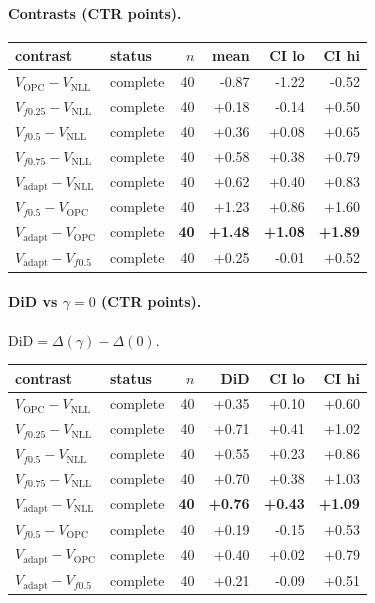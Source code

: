 \documentclass[10pt,a4paper]{article}
\begin{document}
\paragraph{Contrasts (CTR points).}
{\centering\small\begin{tabular}{llrrrr}
\toprule contrast & status & $n$ & mean & CI lo & CI hi \\
\midrule
$V_{\mathrm{OPC}}-V_{\mathrm{NLL}}$ & complete & 40 & -0.87 & -1.22 & -0.52 \\
$V_{f0.25}-V_{\mathrm{NLL}}$ & complete & 40 & +0.18 & -0.14 & +0.50 \\
$V_{f0.5}-V_{\mathrm{NLL}}$ & complete & 40 & +0.36 & +0.08 & +0.65 \\
$V_{f0.75}-V_{\mathrm{NLL}}$ & complete & 40 & +0.58 & +0.38 & +0.79 \\
$V_{\mathrm{adapt}}-V_{\mathrm{NLL}}$ & complete & 40 & +0.62 & +0.40 & +0.83 \\
$V_{f0.5}-V_{\mathrm{OPC}}$ & complete & 40 & +1.23 & +0.86 & +1.60 \\
\textbf{$V_{\mathrm{adapt}}-V_{\mathrm{OPC}}$} & complete & \textbf{40} & \textbf{+1.48} & \textbf{+1.08} & \textbf{+1.89} \\
$V_{\mathrm{adapt}}-V_{f0.5}$ & complete & 40 & +0.25 & -0.01 & +0.52 \\
\bottomrule\end{tabular}\par}
\paragraph{DiD vs $\gamma=0$ (CTR points).} $\mathrm{DiD}=\Delta(\gamma)-\Delta(0)$.
{\centering\small\begin{tabular}{llrrrr}
\toprule contrast & status & $n$ & DiD & CI lo & CI hi \\
\midrule
$V_{\mathrm{OPC}}-V_{\mathrm{NLL}}$ & complete & 40 & +0.35 & +0.10 & +0.60 \\
$V_{f0.25}-V_{\mathrm{NLL}}$ & complete & 40 & +0.71 & +0.41 & +1.02 \\
$V_{f0.5}-V_{\mathrm{NLL}}$ & complete & 40 & +0.55 & +0.23 & +0.86 \\
$V_{f0.75}-V_{\mathrm{NLL}}$ & complete & 40 & +0.70 & +0.38 & +1.03 \\
\textbf{$V_{\mathrm{adapt}}-V_{\mathrm{NLL}}$} & complete & \textbf{40} & \textbf{+0.76} & \textbf{+0.43} & \textbf{+1.09} \\
$V_{f0.5}-V_{\mathrm{OPC}}$ & complete & 40 & +0.19 & -0.15 & +0.53 \\
$V_{\mathrm{adapt}}-V_{\mathrm{OPC}}$ & complete & 40 & +0.40 & +0.02 & +0.79 \\
$V_{\mathrm{adapt}}-V_{f0.5}$ & complete & 40 & +0.21 & -0.09 & +0.51 \\
\bottomrule\end{tabular}\par}
\bigskip
\end{document}

